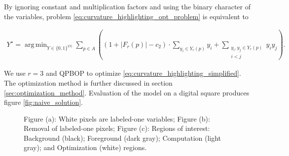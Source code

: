 \documentclass[runningheads]{llncs}
\DeclareMathOperator*{\argmin}{arg\,min}
\begin{document}
	By ignoring constant and multiplication factors and using the binary character of the variables, problem \eqref{eq:curvature_highlighting_opt_problem} is equivalent to

	
\begin{align}			
	Y^{\star} = \argmin_{Y \in \{0,1\}^{|O|}} \sum_{p \in A}{ \left( { (1+ |F_r(p)|-c_2) \cdot \sum_{y_i \in Y_r(p)}{y_i} } + \sum_{ \substack{y_i,y_j \in Y_r(p) \\ i<j} }{y_iy_j} \right) }.
	\label{eq:curvature_highlighting_simplified}
\end{align}

We use $r=3$ and QPBOP to optimize \eqref{eq:curvature_highlighting_simplified}. The optimization method is further discussed in section \ref{sec:optimization_method}. Evaluation of the model on a digital square produces figure \ref{fig:naive_solution}.


	\begin{figure}[!ht]
		\center
		\hspace{40pt}
		\hspace{40pt}
		\caption{Figure (a): White pixels are labeled-one variables; Figure (b): Removal of labeled-one pixels; Figure (c): Regions of interest: Background (black); Foreground (dark gray); Computation (light gray); and Optimization (white) regions.}	
					
	\end{figure}
\end{document}
